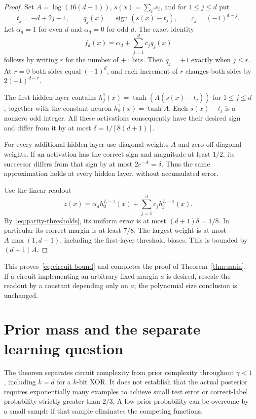 \documentclass[11pt]{article}
\theoremstyle{remark}
\DeclareMathOperator{\sign}{sign}
\begin{document}
\begin{proof}
Set $A=\log(16(d+1))$, $s(x)=\sum_i x_i$, and for $1\le j\le d$
put
\[
 t_j=-d+2j-1,\qquad q_j(x)=\sign(s(x)-t_j),\qquad
 c_j=(-1)^{d-j}.
\]
Let $\alpha_d=1$ for even $d$ and $\alpha_d=0$ for odd $d$.
The exact identity
\begin{equation}\label{eq:parity-thresholds}
 f_d(x)=\alpha_d+\sum_{j=1}^d c_jq_j(x)
\end{equation}
follows by writing $r$ for the number of $+1$ bits. Then $q_j=+1$
exactly when $j\le r$. At $r=0$ both sides equal $(-1)^d$, and
each increment of $r$ changes both sides by $2(-1)^{d-r}$.

The first hidden layer contains
$h_j^1(x)=\tanh(A(s(x)-t_j))$ for $1\le j\le d$, together with
the constant neuron $h_0^1(x)=\tanh A$. Each $s(x)-t_j$ is a nonzero
odd integer. All these activations consequently have their desired
sign and differ from it by at most
$\delta=1/[8(d+1)]$.

For every additional hidden layer use diagonal weights $A$ and
zero off-diagonal weights. If an activation has the correct sign
and magnitude at least $1/2$, its successor differs from that
sign by at most $2e^{-A}=\delta$. Thus the same approximation
holds at every hidden layer, without accumulated error.

Use the linear readout
\[
 z(x)=\alpha_d h_0^{L-1}(x)
             +\sum_{j=1}^d c_jh_j^{L-1}(x).
\]
By~\eqref{eq:parity-thresholds}, its uniform error is at most
$(d+1)\delta=1/8$. In particular its correct margin is at least
$7/8$. The largest weight is at most $A\max(1,d-1)$, including
the first-layer threshold biases. This is bounded by $(d+1)A$.
\end{proof}

This proves~\eqref{eq:circuit-bound} and completes the proof of
Theorem~\ref{thm:main}. If a circuit implementing an arbitrary
fixed margin $a$ is desired, rescale the readout by a constant
depending only on $a$; the polynomial size conclusion is unchanged.

\section{Prior mass and the separate learning question}\label{sec:learning}

The theorem separates circuit complexity from prior complexity
throughout $\gamma<1$, including $k=d$ for a $k$-bit XOR. It does
not establish that the actual posterior requires exponentially many
examples to achieve small test error or correct-label probability
strictly greater than $2/3$. A low prior probability can be overcome
by a small sample if that sample eliminates the competing functions.
\end{document}
